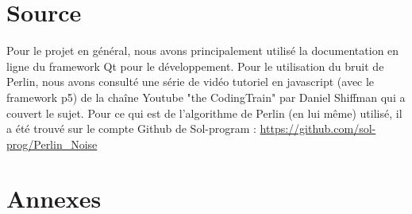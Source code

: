 \documentclass[a4paper,10pt,openany,oneside]{book}
\begin{document}
\chapter{Source}
Pour le projet en général, nous avons principalement utilisé la documentation en ligne du framework Qt pour le développement.
\newline
Pour le utilisation du bruit de Perlin, nous avons consulté une série de vidéo tutoriel en javascript (avec le framework p5) de la chaîne Youtube "the CodingTrain" par Daniel Shiffman qui a couvert le sujet.
\newline
Pour ce qui est de l'algorithme de Perlin (en lui même) utilisé, il a été trouvé sur le compte Github de Sol-program :
\url{https://github.com/sol-prog/Perlin_Noise}

\chapter{Annexes}
\thispagestyle{headings}
\end{document}
